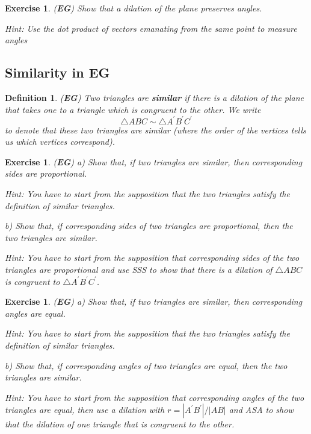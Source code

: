 \documentclass{article}%
\newtheorem{definition}[theorem]{Definition}
\newtheorem{exercise}[theorem]{Exercise}
\begin{document}
\begin{exercise}
(\textbf{EG}) Show that a dilation of the plane preserves angles.

Hint: Use the dot product of vectors emanating from the same point to measure
angles \pagebreak
\end{exercise}

\subsection{Similarity in \textbf{EG}}

\begin{definition}
(\textbf{EG}) Two triangles are \textbf{similar} if there is a dilation of the
plane that takes one to a triangle which is congruent to the other. We write%
\[
\triangle ABC\sim\triangle A^{\prime}B^{\prime}C^{\prime}%
\]
to denote that these two triangles are similar (where the order of the
vertices tells us which vertices correspond).
\end{definition}

\begin{exercise}
(\textbf{EG}) a) Show that, if two triangles are similar, then corresponding
sides are proportional.

Hint: You have to start from the supposition that the two triangles satisfy
the definition of similar triangles.

b) Show that, if corresponding sides of two triangles are proportional, then
the two triangles are similar.

Hint: You have to start from the supposition that corresponding sides of the
two triangles are proportional and use SSS to show that there is a dilation of
$\triangle ABC$ is congruent to $\triangle A^{\prime}B^{\prime}C^{\prime}$.
\end{exercise}

\begin{exercise}
(\textbf{EG}) a) Show that, if two triangles are similar, then corresponding
angles are equal.

Hint: You have to start from the supposition that the two triangles satisfy
the definition of similar triangles.

b) Show that, if corresponding angles of two triangles are equal, then the two
triangles are similar.

Hint: You have to start from the supposition that corresponding angles of the
two triangles are equal, then use a dilation with $r=|A^{\prime}B^{\prime
}|/|AB|$ and ASA to show that the dilation of one triangle that is congruent
to the other.
\end{exercise}
\end{document}

